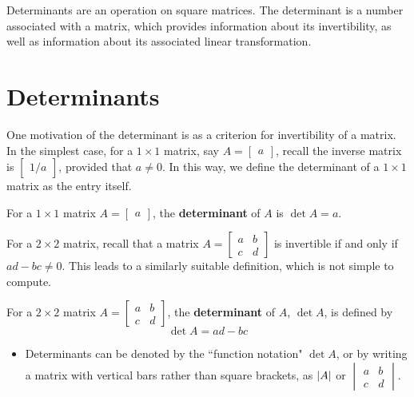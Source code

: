 \documentclass[letterpaper,12pt]{article}
\begin{document}
Determinants are an operation on square matrices. The determinant is a number associated with a matrix, which provides information about its invertibility, as well as information about its associated linear transformation.

\section*{Determinants}
One motivation of the determinant is as a criterion for invertibility of a matrix. In the simplest case, for a $1 \times 1$ matrix, say $A = \begin{bmatrix} a \end{bmatrix}$, recall the inverse matrix is $\begin{bmatrix} 1/a \end{bmatrix}$, provided that $a \neq 0$. In this way, we define the determinant of a $1 \times 1$ matrix as the entry itself.

\begin{definition}
For a $1 \times 1$ matrix $A = \begin{bmatrix} a \end{bmatrix}$, the \textbf{determinant} of $A$ is $\det{A} = a$.
\end{definition}

For a $2 \times 2$ matrix, recall that a matrix $A = \begin{bmatrix} a & b \\ c & d \end{bmatrix}$ is invertible if and only if $ad - bc \neq 0$. This leads to a similarly suitable definition, which is not simple to compute.

\begin{definition}
For a $2 \times 2$ matrix $A = \begin{bmatrix} a & b \\ c & d \end{bmatrix}$, the \textbf{determinant} of $A$, $\det{A}$, is defined by
\begin{equation*}
    \det{A} = ad - bc
\end{equation*}
\begin{itemize}
    \item Determinants can be denoted by the ``function notation" $\det{A}$, or by writing a matrix with vertical bars rather than square brackets, as $\left\lvert A \right\rvert$ or $\begin{vmatrix} a & b \\ c & d \end{vmatrix}$.
\end{itemize}
\end{definition}
\end{document}

